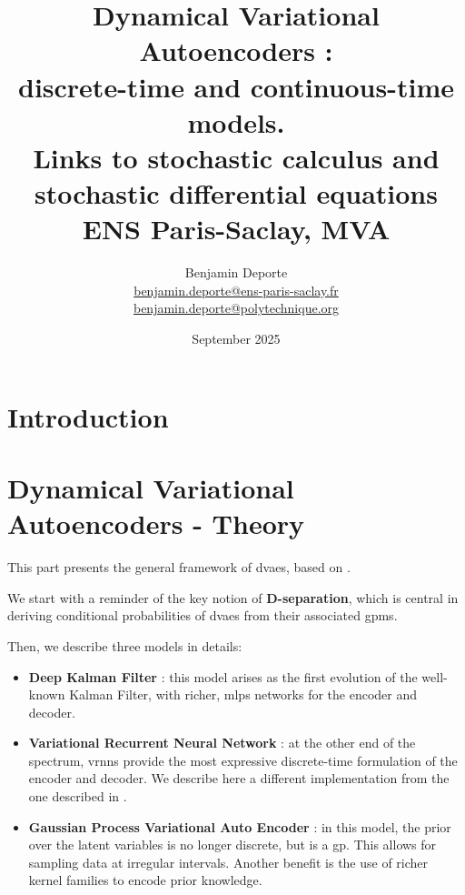 \documentclass[twoside,11pt]{report}
\title{Dynamical Variational Autoencoders :\\ discrete-time and continuous-time models.\\ Links to stochastic calculus and stochastic differential equations\\
\vspace{2cm}
{\Large{ENS Paris-Saclay, MVA}}}
\author{
Benjamin Deporte\\
\href{mailto:benjamin.deporte@ens-paris-saclay.fr}{benjamin.deporte@ens-paris-saclay.fr}\\
\href{mailto:benjamin.deporte@polytechnique.org}{benjamin.deporte@polytechnique.org}%
}
\date{September 2025}
\begin{document}
\everymath{\displaystyle}
\maketitle



\newpage
\singlespacing
\tableofcontents

\newpage
\listoffigures

\part{Introduction}
    
    

%
%
%
%
\part{Dynamical Variational Autoencoders - Theory}

This part presents the general framework of \glspl{dvae}, based on \cite{girin_dynamical_2022}. 

We start with a reminder of the key notion of \textbf{D-separation}, which is central in deriving conditional probabilities of \glspl{dvae} from their 
associated \glspl{gpm}.

Then, we describe three models in details:

\begin{itemize}
    \item \textbf{Deep Kalman Filter} : this model arises as the first evolution of the well-known Kalman Filter, with richer, \glspl{mlp} networks for the encoder and decoder.
    \item \textbf{Variational Recurrent Neural Network} : at the other end of the spectrum, \glspl{vrnn} provide the most expressive discrete-time formulation of the encoder and decoder.
We describe here a different implementation from the one described in \cite{girin_dynamical_2022}.
    \item \textbf{Gaussian Process Variational Auto Encoder} : in this model, the prior over the latent variables is no longer discrete, but is a \gls{gp}.
This allows for sampling data at irregular intervals. Another benefit is the use of richer kernel families to encode prior knowledge.
\end{itemize}
\end{document}
